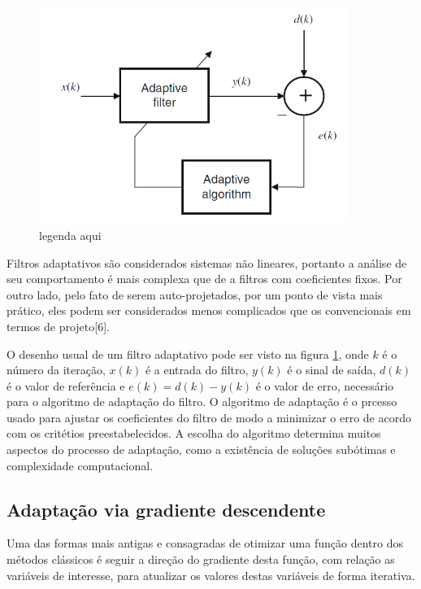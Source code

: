 \documentclass[a4paper, 12pt]{book}
\begin{document}
\begin{figure}[h]
	\centering
	\includegraphics[width=0.9\textwidth]{../figuras/fA.png}
	\caption{legenda aqui}
	\label{fig:filtroAdaptativo}
\end{figure}

\indent Filtros adaptativos são considerados sistemas não lineares, portanto a análise de seu comportamento é mais complexa que de a filtros com coeficientes fixos. Por outro lado, pelo fato de serem auto-projetados, por um ponto de vista mais prático, eles podem ser considerados menos complicados que os convencionais em termos de projeto[6].

\indent O desenho usual de um filtro adaptativo pode ser visto na figura \ref{fig:filtroAdaptativo}, onde $k$ é o número da iteração, $x(k)$ é a entrada do filtro, $y(k)$ é o sinal de saída, $d(k)$ é o valor de referência e $e(k)=d(k)-y(k)$ é o valor de erro, necessário para o algoritmo de adaptação do filtro. O algoritmo de adaptação é o prcesso usado para ajustar os coeficientes do filtro de modo a minimizar o erro de acordo com os critétios preestabelecidos. A escolha do algoritmo determina muitos aspectos do processo de adaptação, como a existência de soluções subótimas e complexidade computacional.

\subsection{Adaptação via gradiente descendente}

Uma das formas mais antigas e consagradas de otimizar uma função dentro dos métodos clássicos é seguir a direção do gradiente desta função, com relação as variáveis de interesse, para atualizar os valores destas variáveis de forma iterativa.
\end{document}
